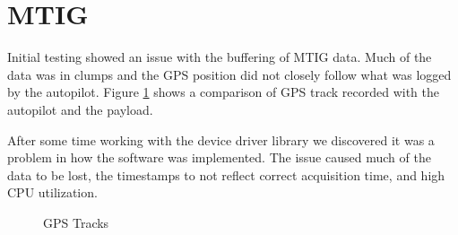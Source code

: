 \documentclass[a4paper,11pt]{report}
\begin{document}
\section{MTIG}

Initial testing showed an issue with the buffering of MTIG data. Much of the data was in clumps and the GPS position did not closely follow what was logged by the autopilot. Figure \ref{fig:track_comp} shows a comparison of GPS track recorded with the autopilot and the payload.

After some time working with the device driver library we discovered it was a problem in how the software was implemented. The issue caused much of the data to be lost, the timestamps to not reflect correct acquisition time, and high CPU utilization. 

\begin{figure}[ht]
  \centering
  \caption{GPS Tracks}
  \label{fig:track_comp}
\end{figure} 
\end{document}
